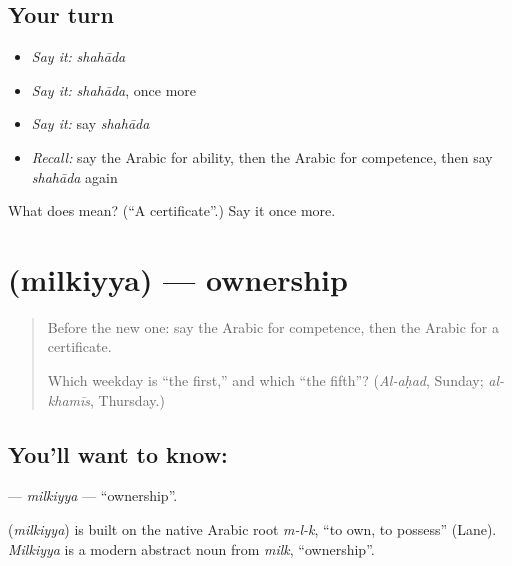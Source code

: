 \subsection*{Your turn}
\begin{itemize}
\raggedright
  \item \emph{Say it:} \emph{shahāda}
  \item \emph{Say it:} \emph{shahāda}, once more
  \item \emph{Say it:} say \emph{shahāda}
  \item \emph{Recall:} say the Arabic for ability, then the Arabic for competence, then say \emph{shahāda} again
\end{itemize}

\begin{tcolorbox}[breakable,colback=teal!4,colframe=teal!35!black,title={Before you move on}]
What does  mean? (\textquotedblleft{}A certificate\textquotedblright{}.) Say it once more.
\end{tcolorbox}
\section[\texorpdfstring{\ar{ملكية} (milkiyya)}{ملكية (milkiyya)}]{ (milkiyya) — ownership}

\label{lesson:AR-C107-milkiyya}



\begin{quote}
Before the new one: say the Arabic for competence, then the Arabic for a certificate.

Which weekday is \textquotedblleft{}the first,\textquotedblright{} and which \textquotedblleft{}the fifth\textquotedblright{}? (\emph{Al-aḥad}, Sunday; \emph{al-khamīs}, Thursday.)
\end{quote}

\subsection*{You'll want to know: }
\textbf{} — \emph{milkiyya} — \textquotedblleft{}ownership\textquotedblright{}.

\begin{cousinweb}
\textbf{} (\emph{milkiyya}) is built on the native Arabic root \emph{m-l-k}, \textquotedblleft{}to own, to possess\textquotedblright{} (Lane). \emph{Milkiyya} is a modern abstract noun from \emph{milk}, \textquotedblleft{}ownership\textquotedblright{}.
\end{cousinweb}

